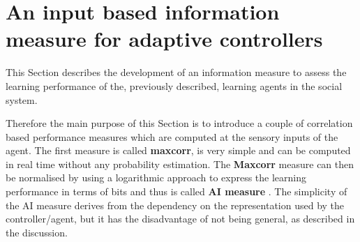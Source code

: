 \section[Introduction: input based measure]{An input based information measure for adaptive controllers \label{Chapter5:Max Corr Input}}

This Section describes the development of an information measure
to assess the learning performance of the, previously described, learning agents
in the social system.

Therefore the main purpose of this Section is to introduce a couple of correlation 
based performance measures which are computed at the sensory inputs of the agent.
The first measure is called \textbf{maxcorr}, is very simple and
can be computed in real time without any probability estimation.
The \textbf{Maxcorr}  measure can then be normalised by using a logarithmic approach
to express the learning performance in terms of bits and thus is called \textbf{AI measure} .
The simplicity of the AI measure  derives from the dependency on the
representation used by the controller/agent, but it has the disadvantage of
not being general, as described in the discussion.

